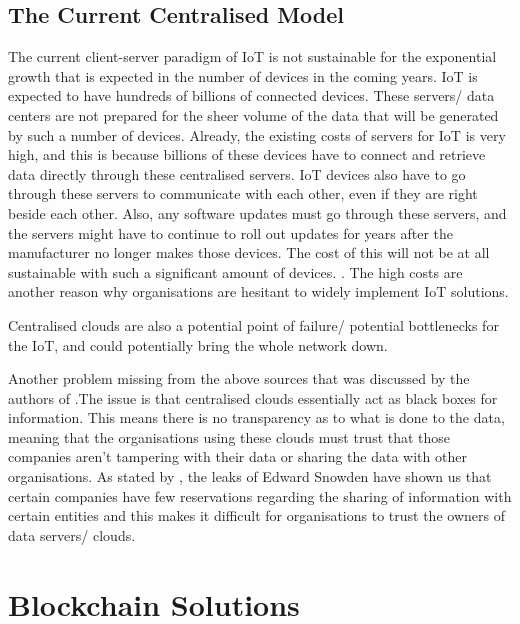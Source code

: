 \documentclass[transmag]{IEEEtran}
\begin{document}
\subsection{The Current Centralised Model}
The current client-server paradigm of IoT is not sustainable for the exponential growth that is expected in the number of devices in the coming years. IoT is expected to have hundreds of billions of connected devices. These servers/ data centers are not prepared for the sheer volume of the data that will be generated by such a number of devices. \cite{ref14} Already, the existing costs of servers for IoT is very high, and this is because billions of these devices have to connect and retrieve data directly through these centralised servers. IoT devices also have to go through these servers to communicate with each other, even if they are right beside each other. Also, any software updates must go through these servers, and the servers might have to continue to roll out updates for years after the manufacturer no longer makes those devices. The cost of this will not be at all sustainable with such a significant amount of devices.\cite{ref12} \cite{ref13} \cite{ref9}. The high costs are another reason why organisations are hesitant to widely implement IoT solutions.\cite{ref8}

\par Centralised clouds are also a potential point of failure/ potential bottlenecks for the IoT, and could potentially bring the whole network down. 

\par Another problem missing from the above sources that was discussed by the authors of \cite{ref7}.The issue is that centralised clouds essentially act as black boxes for information. This means there is no transparency as to what is done to the data, meaning that the organisations using these clouds must trust that those companies aren't tampering with their data or sharing the data with other organisations. As stated by \cite{ref8}, the leaks of Edward Snowden have shown us that certain companies have few reservations regarding the sharing of information with certain entities and this makes it difficult for organisations to trust the owners of data servers/ clouds.

\section{Blockchain Solutions}
\end{document}
